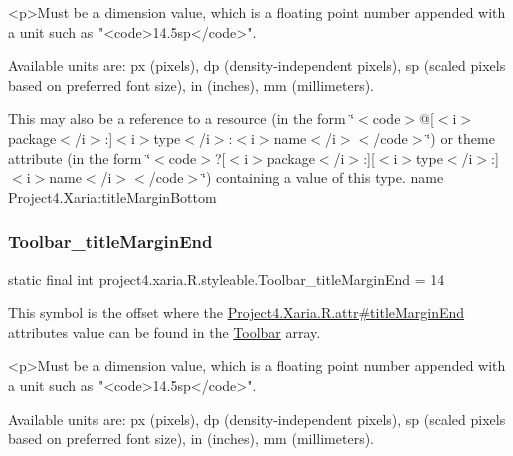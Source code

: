\begin{DoxyVerb}      <p>Must be a dimension value, which is a floating point number appended with a unit such as "<code>14.5sp</code>".
\end{DoxyVerb}
 Available units are\+: px (pixels), dp (density-\/independent pixels), sp (scaled pixels based on preferred font size), in (inches), mm (millimeters). 

This may also be a reference to a resource (in the form \char`\"{}$<$code$>$@\mbox{[}$<$i$>$package$<$/i$>$\+:\mbox{]}$<$i$>$type$<$/i$>$\+:$<$i$>$name$<$/i$>$$<$/code$>$\char`\"{}) or theme attribute (in the form \char`\"{}$<$code$>$?\mbox{[}$<$i$>$package$<$/i$>$\+:\mbox{]}\mbox{[}$<$i$>$type$<$/i$>$\+:\mbox{]}$<$i$>$name$<$/i$>$$<$/code$>$\char`\"{}) containing a value of this type.  name Project4.\+Xaria\+:title\+Margin\+Bottom \mbox{\label{classproject4_1_1xaria_1_1R_1_1styleable_a5d2d546ae88e0aa378d02d8602e73b8a}} 
\subsubsection{\texorpdfstring{Toolbar\+\_\+title\+Margin\+End}{Toolbar\_titleMarginEnd}}
{\footnotesize\ttfamily static final int project4.\+xaria.\+R.\+styleable.\+Toolbar\+\_\+title\+Margin\+End = 14\hspace{0.3cm}{\ttfamily [static]}}

This symbol is the offset where the \hyperlink{}{Project4.\+Xaria.\+R.\+attr\#title\+Margin\+End} attribute\textquotesingle{}s value can be found in the \hyperlink{classproject4_1_1xaria_1_1R_1_1styleable_af6c30f9e9e086f6bf4e510669443fa59}{Toolbar} array.

\begin{DoxyVerb}      <p>Must be a dimension value, which is a floating point number appended with a unit such as "<code>14.5sp</code>".
\end{DoxyVerb}
 Available units are\+: px (pixels), dp (density-\/independent pixels), sp (scaled pixels based on preferred font size), in (inches), mm (millimeters). 

